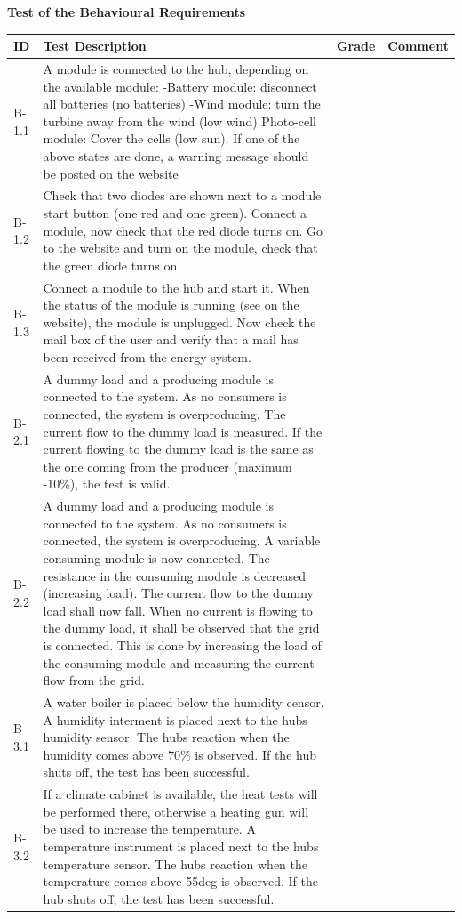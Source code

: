 \textbf{Test of the Behavioural Requirements}
\begin{table}[H]
	\begin{tabular} [b] {| p{1.2cm} |  p{9.3cm} | p{1.2cm} | p{3.8cm} |}
	\hline
	\textbf{ID} & \textbf{Test Description} & \textbf{Grade} & \textbf{Comment} \\\hline
		B-1.1	& A module is connected to the hub, depending on the available module: -Battery module: disconnect all batteries (no batteries) -Wind module: turn the turbine away from the wind (low wind) Photo-cell module: Cover the cells (low sun). If one of the above states are done, a warning message should be posted on the website	&	&\\ \hline
		B-1.2	& Check that two diodes are shown next to a module start button (one red and one green). Connect a module, now check that the red diode turns on. Go to the website and turn on the module, check that the green diode turns on.	&	&\\ \hline
		B-1.3	& Connect a module to the hub and start it. When the status of the module is running (see on the website), the module is unplugged. Now check the mail box of the user and verify that a mail has been received from the energy system.	&	&\\ \hline
		B-2.1	& A dummy load and a producing module is connected to the system. As no consumers is connected, the system is overproducing. The current flow to the dummy load is measured. If the current flowing to the dummy load is the same as the one coming from the producer (maximum -10\%), the test is valid.	&	&\\ \hline
		B-2.2	& A dummy load and a producing module is connected to the system. As no consumers is connected, the system is overproducing. A variable consuming module is now connected. The resistance in the consuming module is decreased (increasing load). The current flow to the dummy load shall now fall. When no current is flowing to the dummy load, it shall be observed that the grid is connected. This is done by increasing the load of the consuming module and measuring the current flow from the grid.	&	&\\ \hline
		B-3.1	& A water boiler is placed below the humidity censor. A humidity interment is placed next to the hubs humidity sensor. The hubs reaction when the humidity comes above 70\% is observed. If the hub shuts off, the test has been successful.	&	&\\ \hline
		B-3.2	& If a climate cabinet is available, the heat tests will be performed there, otherwise a heating gun will be used to increase the temperature. A temperature instrument is placed next to the hubs temperature sensor. The hubs reaction when the temperature comes above 55deg is observed. If the hub shuts off, the test has been successful.	&	&\\ \hline

\end{tabular}
\end{table}
